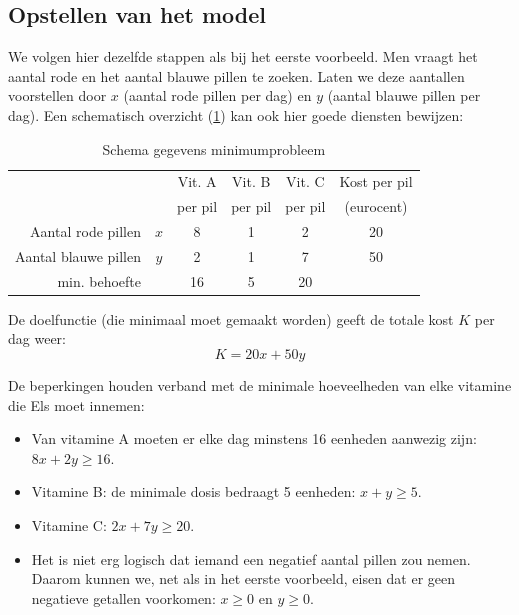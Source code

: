 \subsection{Opstellen van het model}

We volgen hier dezelfde stappen als bij het eerste voorbeeld.
Men vraagt het aantal rode en het aantal blauwe pillen te zoeken.
Laten we deze aantallen voorstellen door $x$ (aantal rode
pillen per dag) en $y$ (aantal blauwe pillen per dag).
Een schematisch overzicht (\cref{tbl:minschema})
kan ook hier goede diensten bewijzen:


\begin{table}[hbp]
    \centering
    \caption{Schema gegevens minimumprobleem}
    \begin{tabular}{rccccc}
    \toprule
       & & Vit. A  & Vit. B & Vit. C & Kost per pil  \\
       & & per pil & per pil& per pil&  (eurocent)  \\
    \midrule
    Aantal rode pillen & $x$ & 8 & 1 & 2 & 20  \\
    Aantal blauwe pillen & $y$ & 2 & 1 & 7 & 50  \\
\cmidrule{3-5}
    min. behoefte &  & 16 & 5 & 20 &   \\
    \bottomrule
\end{tabular}
    \label{tbl:minschema}
\end{table}

De doelfunctie (die minimaal moet gemaakt worden) geeft de totale
kost $K$ per dag weer:
\begin{displaymath}
    K=20x + 50y
\end{displaymath}

De beperkingen houden verband met de minimale hoeveelheden van
elke vitamine die Els moet innemen:
\begin{itemize}
    \item  Van vitamine A moeten er elke dag minstens 16 eenheden aanwezig
zijn: $8x + 2y \geqslant 16$.

    \item  Vitamine B: de minimale dosis  bedraagt 5 eenheden: $x+y\geqslant 5$.

    \item  Vitamine C: $2x + 7y \geqslant 20$.

    \item  Het is niet erg logisch dat iemand een negatief aantal pillen
zou nemen. Daarom kunnen we, net als in het eerste voorbeeld,
eisen dat er geen negatieve getallen voorkomen: $x\geqslant 0$
en $y \geqslant 0$.
\end{itemize}



